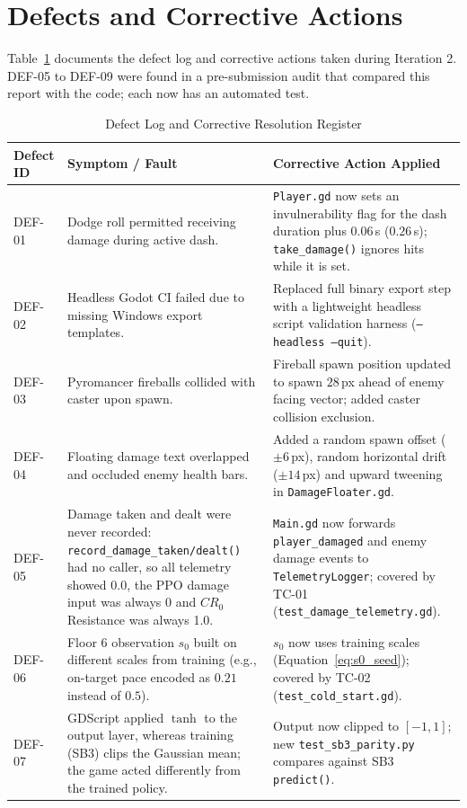 \section{Defects and Corrective Actions}
\label{sec:defects}
Table~\ref{tab:defects} documents the defect log and corrective actions taken during Iteration 2. DEF-05 to DEF-09 were found in a pre-submission audit that compared this report with the code; each now has an automated test.

\begin{table}[!htbp]
\centering
\caption{Defect Log and Corrective Resolution Register}
\label{tab:defects}
\scriptsize
\begin{tabular}{p{}p{}p{}}
\toprule
\textbf{Defect ID} & \textbf{Symptom / Fault} & \textbf{Corrective Action Applied} \\
\midrule
DEF-01 & Dodge roll permitted receiving damage during active dash. & \texttt{Player.gd} now sets an invulnerability flag for the dash duration plus $0.06$\,s ($0.26$\,s); \texttt{take\_damage()} ignores hits while it is set. \\
DEF-02 & Headless Godot CI failed due to missing Windows export templates. & Replaced full binary export step with a lightweight headless script validation harness (\texttt{--headless --quit}). \\
DEF-03 & Pyromancer fireballs collided with caster upon spawn. & Fireball spawn position updated to spawn $28$\,px ahead of enemy facing vector; added caster collision exclusion. \\
DEF-04 & Floating damage text overlapped and occluded enemy health bars. & Added a random spawn offset ($\pm 6$\,px), random horizontal drift ($\pm 14$\,px) and upward tweening in \texttt{DamageFloater.gd}. \\
DEF-05 & Damage taken and dealt were never recorded: \texttt{record\_damage\_taken/dealt()} had no caller, so all telemetry showed 0.0, the PPO damage input was always 0 and $CR_0$ Resistance was always 1.0. & \texttt{Main.gd} now forwards \texttt{player\_damaged} and enemy damage events to \texttt{TelemetryLogger}; covered by TC-01 (\texttt{test\_damage\_telemetry.gd}). \\
DEF-06 & Floor 6 observation $s_0$ built on different scales from training (e.g., on-target pace encoded as $0.21$ instead of $0.5$). & $s_0$ now uses training scales (Equation~\ref{eq:s0_seed}); covered by TC-02 (\texttt{test\_cold\_start.gd}). \\
DEF-07 & GDScript applied $\tanh$ to the output layer, whereas training (SB3) clips the Gaussian mean; the game acted differently from the trained policy. & Output now clipped to $[-1,1]$; new \texttt{test\_sb3\_parity.py} compares against SB3 \texttt{predict()}. \\

\end{tabular}
\end{table}
